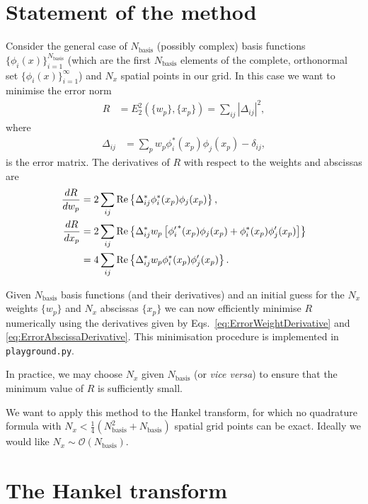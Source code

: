 \documentclass[aip,amsmath,amssymb,reprint,twocolumn]{revtex4-1}
\newcommand{\abs}[1]{\left|#1\right|}
\newcommand{\Nbasis}{N_{\text{basis}}}
\newcommand{\Nx}{N_{x}}
\DeclareMathOperator{\Real}{Re}
\begin{document}
\section{Statement of the method}

Consider the general case of $\Nbasis$ (possibly complex) basis functions $\{\phi_i(x)\}_{i=1}^{\Nbasis}$ (which are the first $\Nbasis$ elements of the complete, orthonormal set $\{\phi_i(x)\}_{i=1}^{\infty}$) and $\Nx$ spatial points in our grid.  In this case we want to minimise the error norm
\begin{align}
  R &= E_2^2\left(\{w_p\}, \{x_p\}\right) = \sum_{ij} \abs{\Delta_{ij}}^2,
\end{align}
where
\begin{align}
  \Delta_{ij} &= \sum_{p} w_p \phi_i^*(x_p) \phi_j(x_p) - \delta_{ij},
\end{align}
is the error matrix.  The derivatives of $R$ with respect to the weights and abscissas are
\begin{align}
  \frac{dR}{dw_p} &= 2 \sum_{ij}\Real\left\{\Delta_{ij}^* \phi_i^*(x_p) \phi_j(x_p)\right\}, \label{eq:ErrorWeightDerivative}\\
  \frac{dR}{dx_p} &= 2 \sum_{ij}\Real\left\{\Delta_{ij}^* w_p \left[{\phi_i'}^*(x_p) \phi_j(x_p) + \phi_i^*(x_p) \phi_j'(x_p)\right] \right\} \notag\\
   &= 4 \sum_{ij}\Real\left\{\Delta_{ij}^* w_p \phi_i^*(x_p) \phi_j'(x_p)\right\}. \label{eq:ErrorAbscissaDerivative}
\end{align}

Given $\Nbasis$ basis functions (and their derivatives) and an initial guess for the $\Nx$ weights $\{w_p\}$ and $\Nx$ abscissas $\{x_p\}$ we can now efficiently minimise $R$ numerically using the derivatives given by Eqs.~\eqref{eq:ErrorWeightDerivative} and \eqref{eq:ErrorAbscissaDerivative}.  This minimisation procedure is implemented in \verb+playground.py+.

In practice, we may choose $\Nx$ given $\Nbasis$ (or \emph{vice versa}) to ensure that the minimum value of $R$ is sufficiently small.

We want to apply this method to the Hankel transform, for which no quadrature formula with $\Nx < \frac{1}{4}(\Nbasis^2 + \Nbasis)$ spatial grid points can be exact.  Ideally we would like $\Nx \sim \mathcal{O}(\Nbasis)$.

\section{The Hankel transform}
\end{document}

